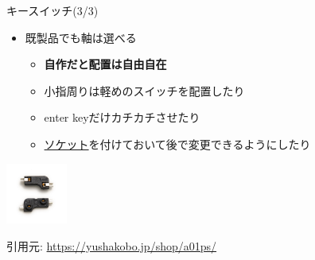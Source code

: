 \documentclass[cjk,dvipdfmx,10pt,compress,fragile%
hyperref={bookmarks=true,bookmarksnumbered=true,bookmarksopen=false,%
colorlinks=false,%
pdftitle={第 134 回 関西 Debian 勉強会},%
pdfauthor={小林},%
pdfsubject={資料},%
}]{beamer}
\begin{document}
\begin{frame}[fragile,t]{キースイッチ(3/3)}
 \begin{itemize}
  \item 既製品でも軸は選べる
       \begin{itemize}
	\item \textbf{自作だと配置は自由自在}
	\item 小指周りは軽めのスイッチを配置したり
	\item enter keyだけカチカチさせたり
	\item \href{https://yushakobo.jp/shop/a01ps/}{ソケット}を付けておいて後で変更できるようにしたり
       \end{itemize}
 \end{itemize}
 \begin{center}
 \includegraphics[keepaspectratio,height=2cm]{./img/key-socket.jpg}
 \end{center}
 \begin{flushright}
  \footnotesize 引用元: \url{https://yushakobo.jp/shop/a01ps/}
 \end{flushright}
\end{frame}
\end{document}
